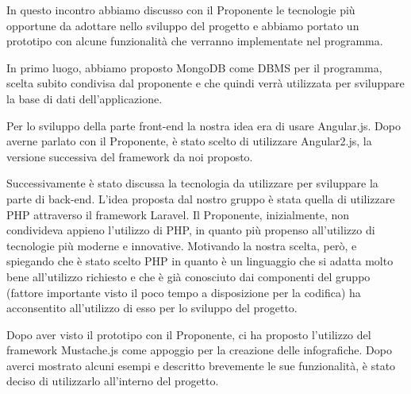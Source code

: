In questo incontro abbiamo discusso con il Proponente le tecnologie più opportune da adottare nello sviluppo del progetto e abbiamo portato un \gls{prototipo} con alcune funzionalità che verranno implementate nel programma.

\noindent In primo luogo, abbiamo proposto \gls{MongoDB} come DBMS per il programma, scelta subito condivisa dal proponente e che quindi verrà utilizzata per sviluppare la base di dati dell'applicazione.

\noindent Per lo sviluppo della parte \gls{front-end} la nostra idea era di usare \gls{Angular}.js. Dopo averne parlato con il Proponente, è stato scelto di utilizzare Angular2.js, la versione successiva del \gls{framework} da noi proposto.

\noindent Successivamente è stato discussa la tecnologia da utilizzare per sviluppare la parte di \gls{back-end}. L'idea proposta dal nostro gruppo è stata quella di utilizzare \gls{PHP} attraverso il \gls{framework} \gls{Laravel}. Il Proponente, inizialmente, non condivideva appieno l'utilizzo di \gls{PHP}, in quanto più propenso all'utilizzo di tecnologie più moderne e innovative. Motivando la nostra scelta, però, e spiegando che è stato scelto \gls{PHP} in quanto è un linguaggio che si adatta molto bene all'utilizzo richiesto e che è già conosciuto dai componenti del gruppo (fattore importante visto il poco tempo a disposizione per la codifica) ha acconsentito all'utilizzo di esso per lo sviluppo del progetto.

\noindent Dopo aver visto il \gls{prototipo} con il Proponente, ci ha proposto l'utilizzo del \gls{framework} \gls{Mustache}.js come appoggio per la creazione delle infografiche. Dopo averci mostrato alcuni esempi e descritto brevemente le sue funzionalità, è stato deciso di utilizzarlo all'interno del progetto.
